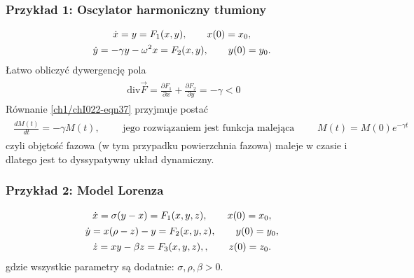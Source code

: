 \documentclass[a4paper,12pt,polish]{sphinxmanual}
\begin{document}
\subsubsection{Przykład 1: Oscylator harmoniczny tłumiony}
\label{ch1/chI022:przyklad-1-oscylator-harmoniczny-tlumiony}\label{ch1/chI022:equation-eqn39}\begin{gather}
\begin{split}\dot x = y = F_1(x, y), \qquad x(0) = x_0,\end{split}\label{ch1/chI022-eqn39}\\\begin{split}\dot y = -\gamma y -\omega^2 x = F_2(x, y), \qquad y(0) = y_0.\end{split}\notag
\end{gather}
Łatwo obliczyć dywergencję pola
\label{ch1/chI022:equation-eqn40}\begin{gather}
\begin{split}\mbox{ div} \vec F =  \frac{\partial F_1}{\partial x} + \frac{\partial F_2}{\partial y} = -\gamma <0\end{split}\label{ch1/chI022-eqn40}
\end{gather}
Równanie \eqref{ch1/chI022-eqn37} przyjmuje postać
\label{ch1/chI022:equation-eqn41}\begin{gather}
\begin{split}\frac{dM(t)}{dt} = -\gamma  M(t),  \qquad \mbox{ jego rozwiązaniem jest funkcja malejąca } \qquad M(t) = M(0) e^{-\gamma t}\end{split}\label{ch1/chI022-eqn41}
\end{gather}
czyli  objętość fazowa (w tym przypadku powierzchnia fazowa) maleje  w czasie i dlatego jest to dyssypatywny układ dynamiczny.


\subsubsection{Przykład 2: Model Lorenza}
\label{ch1/chI022:przyklad-2-model-lorenza}\label{ch1/chI022:equation-eqn42}\begin{gather}
\begin{split}\dot x = \sigma (y-x) = F_1(x, y,  z), \qquad x(0) = x_0,\end{split}\label{ch1/chI022-eqn42}\\\begin{split}\dot y = x(\rho - z) -y = F_2(x, y,  z),  \qquad y(0) = y_0,\end{split}\notag\\\begin{split}\dot z = x y - \beta z = F_3(x, y,  z), , \qquad z(0) = z_0.\end{split}\notag
\end{gather}
gdzie wszystkie parametry są dodatnie: $\sigma, \rho, \beta > 0$.
\end{document}
